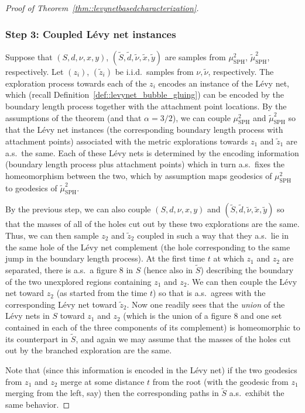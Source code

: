 \documentclass[JEP,XML,SOM,Unicode]{cedram}
\theoremstyle{plain}
\numberwithin{theorem}{section}
\theoremstyle{definition}
\newcommand{\mustwo}{\mu_{\mathrm{SPH}}^2}
\newcommand{\tmustwo}{\wt{\mu}_{\mathrm{SPH}}^2}
\let\wt\widetilde
\begin{document}
\begin{proof}[Proof of Theorem~\ref{thm::levynetbasedcharacterization}]
\subsubsection*{Step 3: Coupled Lévy net instances} Suppose that $(S,d,\nu,x,y)$, $(\wt{S},\wt{d},\wt{\nu},\wt{x},\wt{y})$ are samples from $\mustwo$, $\tmustwo$, respectively. Let $(z_i)$, $(\wt{z}_i)$ be i.i.d.\ samples from $\nu, \wt{\nu}$, respectively. The exploration process towards each of the $z_i$ encodes an instance of the Lévy net, which (recall Definition~\ref{def::levynet_bubble_gluing}) can be encoded by the boundary length process together with the attachment point locations. By the assumptions of the theorem (and that $\alpha=3/2$), we can couple $\mustwo$ and $\tmustwo$ so that the Lévy net instances (\ie the corresponding boundary length process with attachment points) associated with the metric explorations towards $z_1$ and $\wt{z}_1$ are a.s.\ the same. Each of these Lévy nets is determined by the encoding information (boundary length process plus attachment points) which in turn a.s.\ fixes the homeomorphism between the two, which by assumption maps geodesics of $\mustwo$ to geodesics of $\tmustwo$.

By the previous step, we can also couple $(S,d,\nu,x,y)$ and $(\wt{S},\wt{d},\wt{\nu},\wt{x},\wt{y})$ so that the masses of all of the holes cut out by these two explorations are the same. Thus, we can then sample $z_2$ and $\wt{z}_2$ coupled in such a way that they a.s.\ lie in the same hole of the Lévy net complement (\ie the hole corresponding to the same jump in the boundary length process). At the first time $t$ at which $z_1$ and $z_2$ are separated, there is a.s.\ a figure $8$ in $S$ (hence also in $\wt S$) describing the boundary of the two unexplored regions containing $z_1$ and $z_2$. We can then couple the Lévy net toward $z_2$ (as started from the time $t$) so that is a.s.\ agrees with the corresponding Lévy net toward $\wt{z}_2$. Now one readily sees that the \emph{union} of the Lévy nets in $S$ toward $z_1$ and $z_2$ (which is the union of a figure $8$ and one set contained in each of the three components of its complement) is homeomorphic to its counterpart in $\wt{S}$, and again we may assume that the masses of the holes cut out by the branched exploration are the same.

Note that (since this information is encoded in the Lévy net) if the two geodesics from $z_1$ and $z_2$ merge at some distance $t$ from the root (with the geodesic from $z_1$ merging from the left, say) then the corresponding paths in $\wt{S}$ a.s.\ exhibit the same behavior.


\end{proof}
\end{document}
